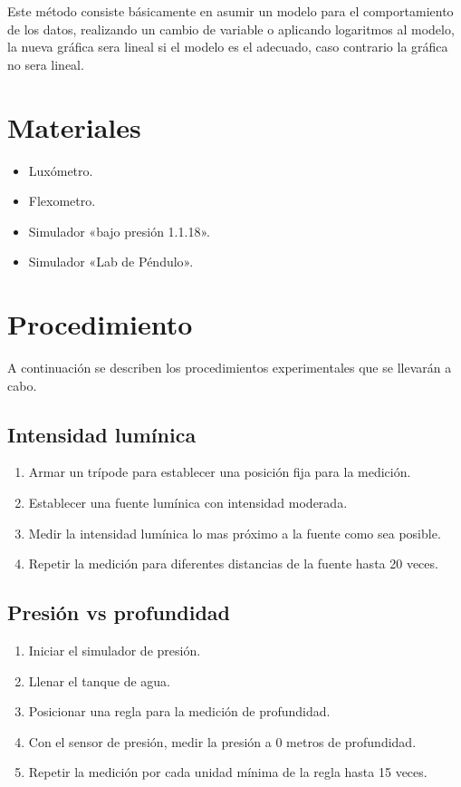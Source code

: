 \documentclass[letter,11pt]{article}
\begin{document}
Este método consiste básicamente en asumir un modelo para el comportamiento de
los datos, realizando un cambio de variable o aplicando logaritmos al modelo, la
nueva gráfica sera lineal si el modelo es el adecuado, caso contrario la gráfica
no sera lineal.

\section{Materiales}
\begin{itemize}
\item Luxómetro.
\item Flexometro.
\item Simulador «bajo presión 1.1.18».
\item Simulador «Lab de Péndulo».
\end{itemize}

\section{Procedimiento}
A continuación se describen los procedimientos experimentales que se llevarán a
cabo.

\subsection{Intensidad lumínica}
\begin{enumerate}
\item Armar un trípode para establecer una posición fija para la medición.
\item Establecer una fuente lumínica con intensidad moderada.
\item Medir la intensidad lumínica lo mas próximo a la fuente como sea posible.
\item Repetir la medición para diferentes distancias de la fuente hasta 20
veces.
\end{enumerate}

\subsection{Presión vs profundidad}
\begin{enumerate}
\item Iniciar el simulador de presión.
\item Llenar el tanque de agua.
\item Posicionar una regla para la medición de profundidad.
\item Con el sensor de presión, medir la presión a 0 metros de profundidad.
\item Repetir la medición por cada unidad mínima de la regla hasta 15 veces.
\end{enumerate}
\end{document}
